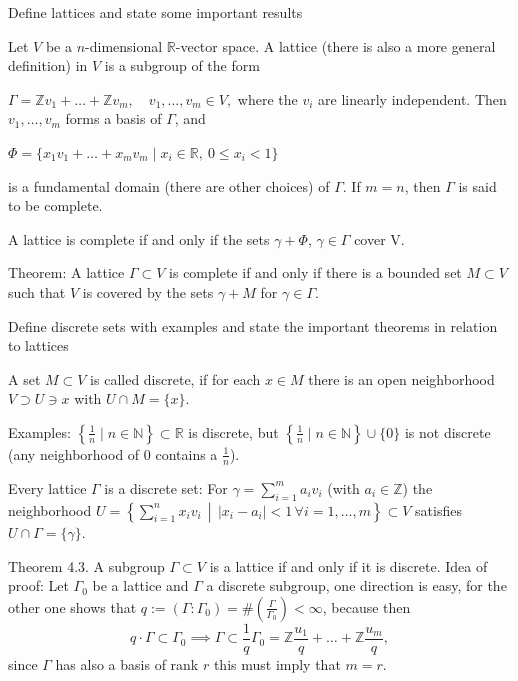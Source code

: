 Define lattices and state some important results

Let \(V\) be a \(n\)-dimensional \(\mathbb{R}\)-vector space. 
A lattice (there is also a more general definition) in \( V \) is a subgroup of the form

\(
\Gamma = \mathbb{Z}v_1 + \ldots + \mathbb{Z}v_m, \quad v_1, \ldots, v_m \in V,
\)
where the \( v_i \) are linearly independent.
Then \(v_1, \ldots, v_m\) forms a basis of \(\Gamma\), and

\(
\Phi = \{ x_1v_1 + \ldots + x_mv_m \mid x_i \in \mathbb{R}, \ 0 \leq x_i < 1 \}
\)

is a fundamental domain (there are other choices) of \(\Gamma\). If \(m = n\), then \(\Gamma\) is said to be complete.

A lattice is complete if and only if the sets \( γ + Φ \), \( γ ∈ Γ \) cover V.

Theorem:
A lattice \( Γ ⊂ V \) is complete if and only if there is a bounded set
\( M \subset V \) such that \( V \) is covered by the sets \( \gamma + M \) for \( \gamma \in \Gamma \).

Define discrete sets with examples and state the important theorems in relation to lattices

A set \( M \subset V \) is called discrete, if for each \( x \in M \) there is an open neighborhood \( V \supset U \ni x \) 
with \( U \cap M = \{x\} \).

Examples:
\(\left\{ \frac{1}{n} \mid n \in \mathbb{N} \right\} \subset \mathbb{R}\) 
is discrete,
but \(\left\{ \frac{1}{n} \mid n \in \mathbb{N} \right\} \cup \{0\}\) is not discrete (any neighborhood of 0 contains a \(\frac{1}{n}\)).

Every lattice \(\Gamma\) is a discrete set: For \(\gamma = \sum_{i=1}^{m} a_i v_i\) (with \(a_i \in \mathbb{Z}\)) the neighborhood
\(
U = \left\{ \sum_{i=1}^{n} x_i v_i \,\middle|\, |x_i - a_i| < 1 \, \forall i = 1, \ldots, m \right\} \subset V
\)
satisfies \(U \cap \Gamma = \{\gamma\}\).

Theorem 4.3. A subgroup \( Γ ⊂ V \) is a lattice if and only if it is discrete.
Idea of proof: Let \( \Gamma_0 \) be a lattice and \( \Gamma \) a discrete subgroup, one direction is easy, 
for the other one shows that
\(q := (\Gamma : \Gamma_0) = \# \left(\frac{\Gamma}{\Gamma_0}\right) < \infty\),
because then
\[q \cdot \Gamma \subset \Gamma_0 \implies \Gamma \subset \frac{1}{q} \Gamma_0 = \mathbb{Z} \frac{u_1}{q} + \ldots + \mathbb{Z} \frac{u_m}{q},\]
since \( \Gamma \) has also a basis of rank \( r \) this must imply that \( m = r \).

